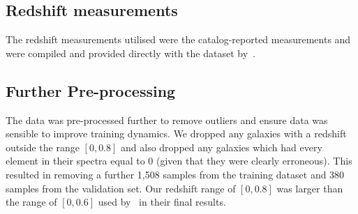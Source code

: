 \subsection{Redshift measurements}\label{subsec:redshift}
The redshift measurements utilised were the catalog-reported measurements and were compiled and provided directly with the
dataset by~\cite{astroclip}.

\subsection{Further Pre-processing}\label{subsec:pre-processing}
The data was pre-processed further to remove outliers and ensure data was sensible to improve training dynamics.
We dropped any galaxies with a redshift outside the range $[0, 0.8]$ and also dropped any galaxies which had every element
in their spectra equal to 0 (given that they were clearly erroneous).
This resulted in removing a further 1,508 samples from the training dataset and 380 samples from the
validation set.
Our redshift range of $[0, 0.8]$ was larger than the range of $[0, 0.6]$ used by~\cite{astroclip} in their final results.
